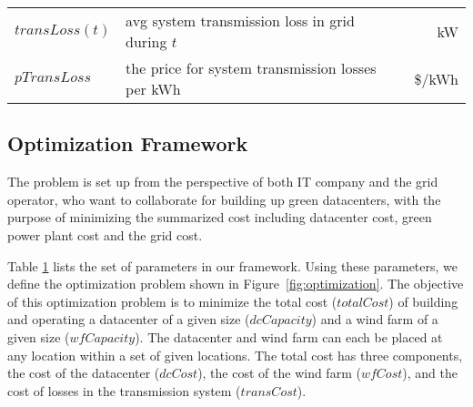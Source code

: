 \begin{table}[ht]
\begin{center}
\begin{tabular}{|l|p{1.9in}|r|}
\hline \hline
$transLoss(t)$  & avg system transmission loss in grid during $t$ & kW \\
$pTransLoss$ & the price for system transmission losses per kWh & \$/kWh \\
\hline
\end{tabular}
\label{tab:par_setting}
\end{center}
\end{table}

\subsection{Optimization Framework}

The problem is set up from the perspective of both IT company and the grid operator, who want to collaborate for building up green datacenters, with the purpose of minimizing the summarized cost including datacenter cost, green power plant cost and the grid cost.

Table \ref{tab:par_setting} lists the set of parameters in our framework.  Using these parameters, we define the optimization problem shown in Figure~\ref{fig:optimization}.  The objective of this optimization problem is to minimize the total cost ($totalCost$) of building and operating a datacenter of a given size ($dcCapacity$) and a wind farm of a given size ($wfCapacity$). %
The datacenter and wind farm can each be placed at any location within a set of given locations.  The total cost has three components, the cost of the datacenter ($dcCost$), the cost of the wind farm ($wfCost$), and the cost of losses in the transmission system ($transCost$).

